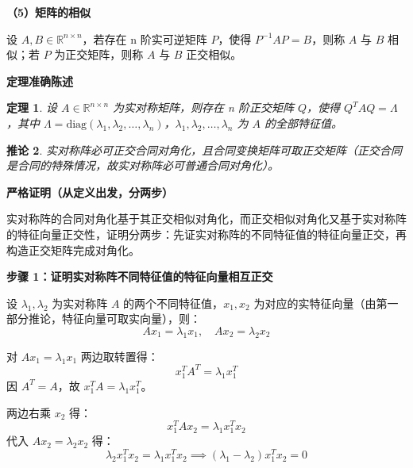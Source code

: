 \documentclass[10pt]{article}
\numberwithin{equation}{section}
\theoremstyle{plain}
\newtheorem{theorem}{定理}[section]
\newtheorem{corollary}[theorem]{推论}
\theoremstyle{definition}
\theoremstyle{remark}
\newcommand{\R}{\mathbb{R}}
\begin{document}
{\par\vspace{0.8ex}\noindent\normalsize\bfseries\color{secblue} （5）矩阵的相似\par}

设 $A,B\in\R^{n\times n}$，若存在 n 阶实可逆矩阵 $P$，使得 $P^{-1} AP=B$，则称 $A$ 与 $B$ 相似；若 $P$ 为正交矩阵，则称 $A$ 与 $B$ 正交相似。

{\par\vspace{0.8ex}\noindent\normalsize\bfseries\color{secblue} 定理准确陈述\par}

\begin{theorem}
	设 $A\in\R^{n\times n}$ 为实对称矩阵，则存在 n 阶正交矩阵 $Q$，使得 $Q^T AQ=\Lambda$，其中 $\Lambda=\text{diag}(\lambda_1,\lambda_2,\ldots,\lambda_n)$，$\lambda_1,\lambda_2,\ldots,\lambda_n$ 为 $A$ 的全部特征值。
\end{theorem}

\begin{corollary}
	实对称阵必可正交合同对角化，且合同变换矩阵可取正交矩阵（正交合同是合同的特殊情况，故实对称阵必可普通合同对角化）。
\end{corollary}

{\par\vspace{0.8ex}\noindent\normalsize\bfseries\color{secblue} 严格证明（从定义出发，分两步）\par}

实对称阵的合同对角化基于其正交相似对角化，而正交相似对角化又基于实对称阵的特征向量正交性，证明分两步：先证实对称阵的不同特征值的特征向量正交，再构造正交矩阵完成对角化。

{\par\vspace{0.8ex}\noindent\normalsize\bfseries\color{secblue} 步骤 1：证明实对称阵不同特征值的特征向量相互正交\par}

设 $\lambda_1,\lambda_2$ 为实对称阵 $A$ 的两个不同特征值，$x_1,x_2$ 为对应的实特征向量（由第一部分推论，特征向量可取实向量），则：
\[Ax_1=\lambda_1 x_1,\quad Ax_2=\lambda_2 x_2\]

对 $Ax_1=\lambda_1 x_1$ 两边取转置得：
\[x_1^T A^T=\lambda_1 x_1^T\]
因 $A^T=A$，故 $x_1^T A=\lambda_1 x_1^T$。

两边右乘 $x_2$ 得：
\[x_1^T Ax_2=\lambda_1 x_1^T x_2\]
代入 $Ax_2=\lambda_2 x_2$ 得：
\[\lambda_2 x_1^T x_2=\lambda_1 x_1^T x_2\implies(\lambda_1-\lambda_2)x_1^T x_2=0\]
\end{document}
